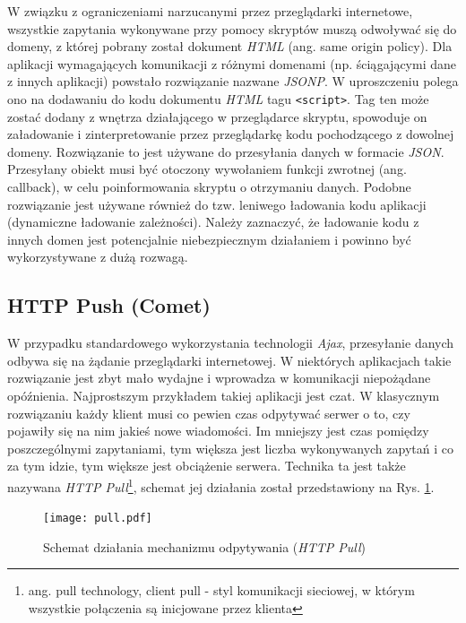 \documentclass[11pt,twoside]{report}
\providecommand{\imref}[1]{Rys. \ref{#1}} %
\begin{document}
W związku z ograniczeniami narzucanymi przez przeglądarki internetowe,
wszystkie zapytania wykonywane przy pomocy skryptów muszą odwoływać
się do domeny, z której pobrany został dokument
\emph{HTML}\cite{origin} (ang. same origin policy). Dla aplikacji
wymagających komunikacji z różnymi domenami (np. ściągającymi dane z
innych aplikacji) powstało rozwiązanie nazwane \emph{JSONP}. W
uproszczeniu polega ono na dodawaniu do kodu dokumentu \emph{HTML}
tagu \texttt{<script>}. Tag ten może zostać dodany z wnętrza
działającego w przeglądarce skryptu, spowoduje on załadowanie i
zinterpretowanie przez przeglądarkę kodu pochodzącego z dowolnej
domeny. Rozwiązanie to jest używane do przesyłania danych w formacie
\emph{JSON}. Przesyłany obiekt musi być otoczony wywołaniem funkcji
zwrotnej (ang. callback), w celu poinformowania skryptu o otrzymaniu
danych. Podobne rozwiązanie jest używane również do tzw. leniwego
ładowania kodu aplikacji (dynamiczne ładowanie zależności). Należy
zaznaczyć, że ładowanie kodu z innych domen jest potencjalnie
niebezpiecznym działaniem i powinno być wykorzystywane z dużą rozwagą.

\subsection{HTTP Push (Comet)}
W przypadku standardowego wykorzystania technologii \emph{Ajax},
przesyłanie danych odbywa się na żądanie przeglądarki internetowej. W
niektórych aplikacjach takie rozwiązanie jest zbyt mało wydajne i
wprowadza w komunikacji niepożądane opóźnienia. Najprostszym
przykładem takiej aplikacji jest czat. W klasycznym rozwiązaniu każdy
klient musi co pewien czas odpytywać serwer o to, czy pojawiły się na
nim jakieś nowe wiadomości. Im mniejszy jest czas pomiędzy
poszczególnymi zapytaniami, tym większa jest liczba wykonywanych
zapytań i co za tym idzie, tym większe jest obciążenie
serwera. Technika ta jest także nazywana \emph{HTTP
  Pull}\footnote{ang. pull technology, client pull - styl komunikacji
  sieciowej, w którym wszystkie połączenia są inicjowane przez
  klienta\cite{pull}}, schemat jej działania został przedstawiony na
\imref{pull}.

\begin{figure}[ht]
  \begin{center}
    \texttt{[image: pull.pdf]}
  \end{center}
  \caption{Schemat działania mechanizmu odpytywania (\emph{HTTP
      Pull})}
  \label{pull}
\end{figure}
\end{document}
